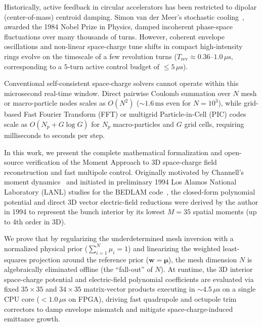 \documentclass[11pt,a4paper]{article}
\begin{document}
Historically, active feedback in circular accelerators has been restricted to dipolar (center-of-mass) centroid damping. Simon van der Meer's stochastic cooling~\cite{vandermeer1972stochastic,vandermeer1985nobel}, awarded the 1984 Nobel Prize in Physics, damped incoherent phase-space fluctuations over many thousands of turns. However, coherent envelope oscillations and non-linear space-charge tune shifts in compact high-intensity rings evolve on the timescale of a few revolution turns ($T_{\mathrm{rev}} \approx 0.36\text{--}1.0\,\mu\mathrm{s}$, corresponding to a $5$-turn active control budget of $\le 5\,\mu\mathrm{s}$).

Conventional self-consistent space-charge solvers cannot operate within this microsecond real-time window. Direct pairwise Coulomb summation over $N$ mesh or macro-particle nodes scales as $O(N^2)$ ($\sim 1.6\,\mathrm{ms}$ even for $N=10^3$), while grid-based Fast Fourier Transform (FFT) or multigrid Particle-in-Cell (PIC) codes~\cite{birdsall2018plasma,qiang2000three} scale as $O(N_p + G \log G)$ for $N_p$ macro-particles and $G$ grid cells, requiring milliseconds to seconds per step.

In this work, we present the complete mathematical formalization and open-source verification of the Moment Approach to 3D space-charge field reconstruction and fast multipole control. Originally motivated by Channell's moment dynamics~\cite{channell1993moment} and initiated in preliminary 1994 Los Alamos National Laboratory (LANL) studies for the BEDLAM code~\cite{ahn1994preliminary}, the closed-form polynomial potential and direct 3D vector electric-field reductions were derived by the author in 1994 to represent the bunch interior by its lowest $M = 35$ spatial moments (up to 4th order in 3D).

We prove that by regularizing the underdetermined mesh inversion with a normalized physical prior ($\sum_{i=1}^N \mu_i = 1$) and linearizing the weighted least-squares projection around the reference prior ($\bm{w} = \bm{\mu}$), the mesh dimension $N$ is algebraically eliminated offline (the ``fall-out'' of $N$). At runtime, the 3D interior space-charge potential and electric-field polynomial coefficients are evaluated via fixed $35 \times 35$ and $34 \times 35$ matrix-vector products executing in $\sim 4.5\,\mu\mathrm{s}$ on a single CPU core ($< 1.0\,\mu\mathrm{s}$ on FPGA), driving fast quadrupole and octupole trim correctors to damp envelope mismatch and mitigate space-charge-induced emittance growth.
\end{document}

